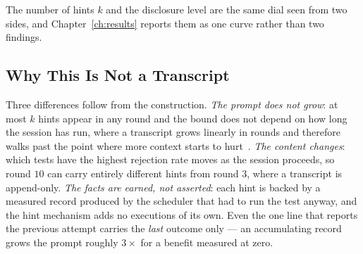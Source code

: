 The number of hints $k$ and the disclosure level are the same dial seen from two
sides, and Chapter~\ref{ch:results} reports them as one curve rather than two
findings.

\subsection{Why This Is Not a Transcript}

Three differences follow from the construction. \emph{The prompt does not
grow}: at most $k$ hints appear in any round and the bound does not depend on
how long the session has run, where a transcript grows linearly in rounds and
therefore walks past the point where more context starts to
hurt~\citep{parasaram2025factselection}. \emph{The content changes}: which
tests have the highest rejection rate moves as the session proceeds, so round
$10$ can carry entirely different hints from round $3$, where a transcript is
append-only. \emph{The facts are earned, not asserted}: each hint is backed by a measured
record produced by the scheduler that had to run the test anyway, and the hint
mechanism adds no executions of its own. Even the one line that reports the
previous attempt carries the \emph{last} outcome only --- an accumulating
record grows the prompt roughly $3\times$ for a benefit measured at zero.

